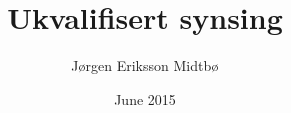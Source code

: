 \documentclass[twoside,english]{uiofysmaster}
\author{J\o rgen Eriksson Midtb\o}
\title{Ukvalifisert synsing}
\date{June 2015}
\begin{document}
\begin{titlepage}
\maketitle
\end{titlepage}
\end{document}
